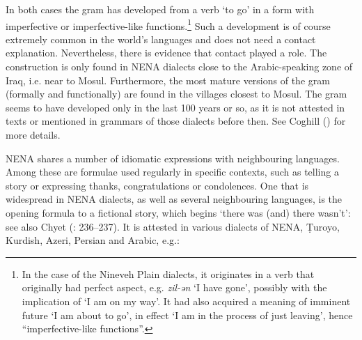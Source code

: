 \documentclass[output=paper]{langsci/langscibook}
\begin{document}
In both cases the gram has developed from a verb ‘to go’ in a form with imperfective or imperfective-like functions.\footnote{In the case of the Nineveh Plain dialects, it originates in a verb that originally had perfect aspect, e.g. \textit{zil-ən} ‘I have gone’, possibly with the implication of ‘I am on my way’. It had also acquired a meaning of imminent future ‘I am about to go’, in effect ‘I am in the process of just leaving’, hence ``imperfective-like functions''.} Such a development is of course extremely common in the world’s languages and does not need a contact explanation. Nevertheless, there is evidence that contact played a role. The construction is only found in NENA dialects close to the Arabic-speaking zone of Iraq, i.e. near to Mosul. Furthermore, the most mature versions of the gram (formally and functionally) are found in the villages closest to Mosul. The gram seems to have developed only in the last 100 years or so, as it is not attested in texts or mentioned in grammars of those dialects before then. See Coghill (\citeyear{Coghill2010,Coghill2012}) for more details.

NENA shares a number of idiomatic expressions with neighbouring languages. Among these are formulae used regularly in specific contexts, such as telling a story or expressing thanks, congratulations or condolences. One that is widespread in NENA dialects, as well as several neighbouring languages, is the opening formula to a fictional story, which begins ‘there was (and) there wasn’t’: see also Chyet (\citeyear{Chyet1995}: 236–237). It is attested in various dialects of NENA, Ṭuroyo, Kurdish, Azeri, Persian and Arabic, e.g.:
\end{document}
